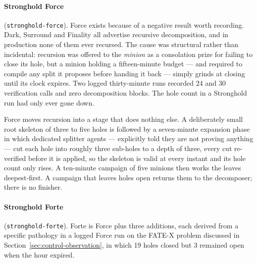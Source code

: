 \documentclass[12pt, a4paper]{article}
\begin{document}
\paragraph{Stronghold Force} (\texttt{stronghold-force}). Force exists
because of a negative result worth recording. Dark, Surround and Finality
all advertise recursive decomposition, and in production none of them ever
recursed. The cause was structural rather than incidental: recursion was
offered to the \emph{minion} as a consolation prize for failing to close its
hole, but a minion holding a fifteen-minute budget --- and required to
compile any split it proposes before handing it back --- simply grinds at
closing until its clock expires. Two logged thirty-minute runs recorded 24
and 30 verification calls and zero decomposition blocks. The hole count in a
Stronghold run had only ever gone down.

Force moves recursion into a stage that does nothing else. A deliberately
small root skeleton of three to five holes is followed by a seven-minute
expansion phase in which dedicated splitter agents --- explicitly told they
are not proving anything --- cut each hole into roughly three sub-holes to a
depth of three, every cut re-verified before it is applied, so the skeleton
is valid at every instant and its hole count only rises. A ten-minute
campaign of five minions then works the leaves deepest-first. A campaign
that leaves holes open returns them to the decomposer; there is no finisher.

\paragraph{Stronghold Forte} (\texttt{stronghold-forte}). Forte is Force
plus three additions, each derived from a specific pathology in a logged
Force run on the FATE-X problem discussed in
Section~\ref{sec:control-observation}, in which 19 holes closed but 3
remained open when the hour expired.
\end{document}

